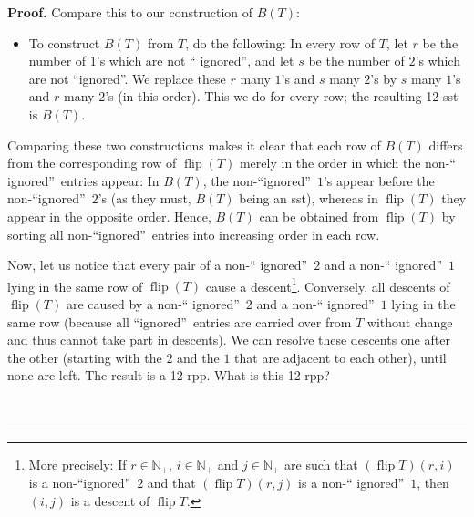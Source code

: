 \documentclass[numbers=enddot,12pt,final,onecolumn,notitlepage]{scrartcl}%
\theoremstyle{definition}
\newenvironment{proof}[1][Proof]{\noindent\textbf{#1.} }{\ \rule{0.5em}{0.5em}}
\begin{document}
\begin{proof}
Compare this to our construction of $B\left(  T\right)  $:

\begin{itemize}
\item To construct $B\left(  T\right)  $ from $T$, do the following: In every
row of $T$, let $r$ be the number of $1$'s which are not \textquotedblleft
ignored\textquotedblright, and let $s$ be the number of $2$'s which are not
\textquotedblleft ignored\textquotedblright. We replace these $r$ many $1$'s
and $s$ many $2$'s by $s$ many $1$'s and $r$ many $2$'s (in this order). This
we do for every row; the resulting 12-sst is $B\left(  T\right)  $.
\end{itemize}

Comparing these two constructions makes it clear that each row of $B\left(
T\right)  $ differs from the corresponding row of $\operatorname*{flip}\left(
T\right)  $ merely in the order in which the non-\textquotedblleft
ignored\textquotedblright\ entries appear: In $B\left(  T\right)  $, the
non-\textquotedblleft ignored\textquotedblright\ $1$'s appear before the
non-\textquotedblleft ignored\textquotedblright\ $2$'s (as they must,
$B\left(  T\right)  $ being an sst), whereas in $\operatorname*{flip}\left(
T\right)  $ they appear in the opposite order. Hence, $B\left(  T\right)  $
can be obtained from $\operatorname*{flip}\left(  T\right)  $ by sorting all
non-\textquotedblleft ignored\textquotedblright\ entries into increasing order
in each row.

Now, let us notice that every pair of a non-\textquotedblleft
ignored\textquotedblright\ $2$ and a non-\textquotedblleft
ignored\textquotedblright\ $1$ lying in the same row of $\operatorname*{flip}%
\left(  T\right)  $ cause a descent\footnote{More precisely: If $r\in
\mathbb{N}_{+}$, $i\in\mathbb{N}_{+}$ and $j\in\mathbb{N}_{+}$ are such that
$\left(  \operatorname*{flip}T\right)  \left(  r,i\right)  $ is a
non-\textquotedblleft ignored\textquotedblright\ $2$ and that $\left(
\operatorname*{flip}T\right)  \left(  r,j\right)  $ is a non-\textquotedblleft
ignored\textquotedblright\ $1$, then $\left(  i,j\right)  $ is a descent of
$\operatorname*{flip}T$.}. Conversely, all descents of $\operatorname*{flip}%
\left(  T\right)  $ are caused by a non-\textquotedblleft
ignored\textquotedblright\ $2$ and a non-\textquotedblleft
ignored\textquotedblright\ $1$ lying in the same row (because all
\textquotedblleft ignored\textquotedblright\ entries are carried over from $T$
without change and thus cannot take part in descents). We can resolve these
descents one after the other (starting with the $2$ and the $1$ that are
adjacent to each other), until none are left. The result is a 12-rpp. What is
this 12-rpp?


\end{proof}
\end{document}
